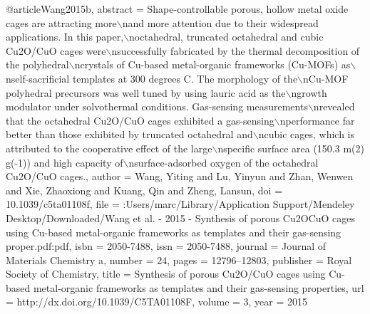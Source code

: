 @article{Wang2015b,
abstract = {Shape-controllable porous, hollow metal oxide cages are attracting more$\backslash$nand more attention due to their widespread applications. In this paper,$\backslash$noctahedral, truncated octahedral and cubic Cu2O/CuO cages were$\backslash$nsuccessfully fabricated by the thermal decomposition of the polyhedral$\backslash$ncrystals of Cu-based metal-organic frameworks (Cu-MOFs) as$\backslash$nself-sacrificial templates at 300 degrees C. The morphology of the$\backslash$nCu-MOF polyhedral precursors was well tuned by using lauric acid as the$\backslash$ngrowth modulator under solvothermal conditions. Gas-sensing measurements$\backslash$nrevealed that the octahedral Cu2O/CuO cages exhibited a gas-sensing$\backslash$nperformance far better than those exhibited by truncated octahedral and$\backslash$ncubic cages, which is attributed to the cooperative effect of the large$\backslash$nspecific surface area (150.3 m(2) g(-1)) and high capacity of$\backslash$nsurface-adsorbed oxygen of the octahedral Cu2O/CuO cages.},
author = {Wang, Yiting and Lu, Yinyun and Zhan, Wenwen and Xie, Zhaoxiong and Kuang, Qin and Zheng, Lansun},
doi = {10.1039/c5ta01108f},
file = {:Users/marc/Library/Application Support/Mendeley Desktop/Downloaded/Wang et al. - 2015 - Synthesis of porous Cu2OCuO cages using Cu-based metal-organic frameworks as templates and their gas-sensing proper.pdf:pdf},
isbn = {2050-7488},
issn = {2050-7488},
journal = {Journal of Materials Chemistry a},
number = {24},
pages = {12796--12803},
publisher = {Royal Society of Chemistry},
title = {{Synthesis of porous Cu2O/CuO cages using Cu-based metal-organic frameworks as templates and their gas-sensing properties}},
url = {http://dx.doi.org/10.1039/C5TA01108F},
volume = {3},
year = {2015}
}
